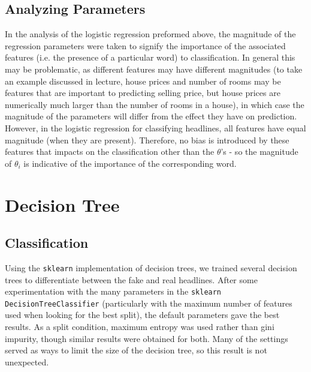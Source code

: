 \documentclass{article}
\begin{document}
   \subsection{Analyzing Parameters}
   In the analysis of the logistic regression preformed above, the magnitude of the regression parameters
   were taken to signify the importance of the associated features (i.e. the presence of a particular word)
   to classification. In general this may be problematic, as different features may have different
   magnitudes (to take an example discussed in lecture, house prices and number of rooms may be features that
   are important to predicting selling price, but house prices are numerically much larger than the number of
   rooms in a house), in which case the magnitude of the parameters will differ from the effect they have on
   prediction.
   However, in the logistic regression for classifying headlines, all features have equal magnitude (when
   they are present). Therefore, no bias is introduced by these features that impacts on the classification
   other than the $\theta$'s - so the magnitude of $\theta_i$ is indicative of the importance of the
   corresponding word.



   \section{Decision Tree}
   \subsection{Classification}
   Using the \texttt{sklearn} implementation of decision trees, we trained several decision trees
   to differentiate between the fake and real headlines. After some experimentation with the many parameters
   in the \texttt{sklearn DecisionTreeClassifier} (particularly with the maximum number of features used
   when looking for the best split), the default parameters gave the best results. As a split condition,
   maximum entropy was used rather than gini impurity, though similar results were obtained for both.
   Many of the settings served as ways to limit the size of the decision tree, so this result is not unexpected.
\end{document}

